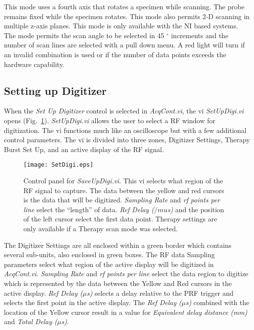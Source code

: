\documentclass[10pt]{article}
\begin{document}
This mode uses a fourth axis that rotates a specimen while
scanning. The probe remains fixed while the specimen rotates. This
mode also permits 2-D scanning in multiple z-axis planes. This
mode is only available with the NI based systems. The mode permits
the scan angle to be selected in 45 $^{\circ}$ increments and the
number of scan lines are selected with a pull down menu. A red
light will turn if an invalid combination is used or if the number
of data points exceeds the hardware capability.

\subsection{Setting up Digitizer}
\label{sec:digi}

When the {\it Set Up Digitizer} control is selected in {\it
AcqCont.vi}, the vi {\it SetUpDigi.vi} opens
(Fig.~\ref{fig:SetDigi}). {\it SetUpDigi.vi} allows the user to
select a RF window for digitization. The vi functions much like an
oscilloscope but with a few additional control parameters. The vi
is divided into three zones, Digitizer Settings, Therapy Burst Set
Up, and an active display of the RF signal.

\begin{figure}[!htb]
\begin{center}
\texttt{[image: SetDigi.eps]}
 \caption{Control panel for {\it SaveUpDigi.vi}. This vi selects what
 region of the RF signal to capture. The data between the yellow and red
 cursors is the data that will be digitized. {\it Sampling Rate} and {\it rf
 points per line} select the ``length'' of data. {\it Ref Delay ($/mu$s)} and
 the position of the left cursor select the first data point. Therapy settings
 are only available if a Therapy scan mode was selected.}
 \label{fig:SetDigi}
\end{center}
\end{figure}

The Digitizer Settings are all enclosed within a green border
which contains several sub-units, also enclosed in green boxes.
The RF data Sampling parameters select what region of the active
display will be digitized in {\it AcqCont.vi}. {\it Sampling Rate}
and {\it rf points per line} select the data region to digitize
which is represented by the data between the Yellow and Red
cursors in the active display. {\it Ref Delay ($\mu$s)} selects a
delay relative to the PRF trigger and selects the first point in
the active display. The {\it Ref Delay ($\mu$s)} combined with the
location of the Yellow cursor result in a value for {\it
Equivalent delay distance (mm)} and {\it Total Delay ($\mu$s)}.
\end{document}
